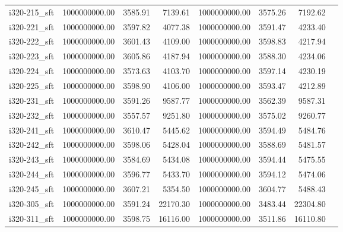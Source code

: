 \begin{tabular}{llrrrrrr}
i320-215\_sft &      1000000000.00 &                3585.91 &          7139.61 &    1000000000.00 &              3575.26 &        7192.62 \\
i320-221\_sft &      1000000000.00 &                3597.82 &          4077.38 &    1000000000.00 &              3591.47 &        4233.40 \\
i320-222\_sft &      1000000000.00 &                3601.43 &          4109.00 &    1000000000.00 &              3598.83 &        4217.94 \\
i320-223\_sft &      1000000000.00 &                3605.86 &          4187.94 &    1000000000.00 &              3588.30 &        4234.06 \\
i320-224\_sft &      1000000000.00 &                3573.63 &          4103.70 &    1000000000.00 &              3597.14 &        4230.19 \\
i320-225\_sft &      1000000000.00 &                3598.90 &          4106.00 &    1000000000.00 &              3593.47 &        4212.89 \\
i320-231\_sft &      1000000000.00 &                3591.26 &          9587.77 &    1000000000.00 &              3562.39 &        9587.31 \\
i320-232\_sft &      1000000000.00 &                3557.57 &          9251.80 &    1000000000.00 &              3575.02 &        9260.77 \\
i320-241\_sft &      1000000000.00 &                3610.47 &          5445.62 &    1000000000.00 &              3594.49 &        5484.76 \\
i320-242\_sft &      1000000000.00 &                3598.06 &          5428.04 &    1000000000.00 &              3588.69 &        5481.57 \\
i320-243\_sft &      1000000000.00 &                3584.69 &          5434.08 &    1000000000.00 &              3594.44 &        5475.55 \\
i320-244\_sft &      1000000000.00 &                3596.77 &          5433.70 &    1000000000.00 &              3594.12 &        5474.06 \\
i320-245\_sft &      1000000000.00 &                3607.21 &          5354.50 &    1000000000.00 &              3604.77 &        5488.43 \\
i320-305\_sft &      1000000000.00 &                3591.24 &         22170.30 &    1000000000.00 &              3483.44 &       22304.80 \\
i320-311\_sft &      1000000000.00 &                3598.75 &         16116.00 &    1000000000.00 &              3511.86 &       16110.80 \\

\end{tabular}
